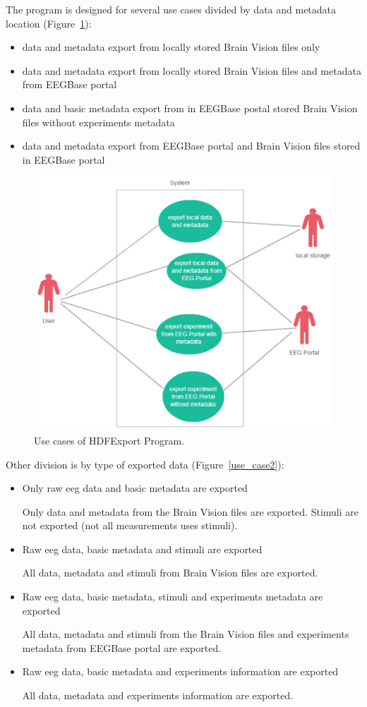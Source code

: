 The program is designed for several use cases divided by data and metadata location (Figure~\ref{use_case1}):
\begin{itemize}
\item data and metadata export from locally stored Brain Vision files only
\item data and metadata export from locally stored Brain Vision files and metadata from EEGBase portal
\item data and basic metadata export from in EEGBase postal stored Brain Vision files without experiments metadata
\item data and metadata export from EEGBase portal and Brain Vision files stored in EEGBase portal
\end{itemize}

\begin{figure}
	\includegraphics[scale=0.5]{obrazky/use_case_location.pdf}	
	\caption{Use cases of HDFExport Program.}
	\label{use_case1}
\end{figure}
Other division is by type of exported data (Figure~\ref{use_case2}):
\begin{itemize}
	\item Only raw \gls{eeg} data and basic metadata are exported
	
	Only data and metadata from the Brain Vision files are exported. Stimuli are not exported (not all measurements uses stimuli).
	\item Raw \gls{eeg} data, basic metadata and stimuli are exported
	
	All data, metadata and stimuli from Brain Vision files are exported.
	\item Raw \gls{eeg} data, basic metadata, stimuli and experiments metadata are exported
	
	All data, metadata and stimuli from the Brain Vision files and experiments metadata from EEGBase portal are exported.
	\item Raw \gls{eeg} data, basic metadata and experiments information are exported
	
	All data, metadata and experiments information are exported.
\end{itemize}
